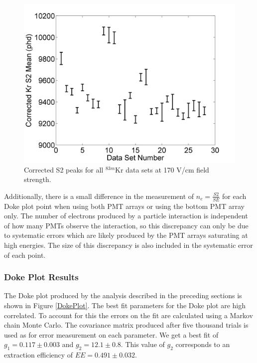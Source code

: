 \documentclass[a4paper,12pt]{article}
\begin{document}
{\begin{figure}[H]
\centering
\includegraphics[scale=0.4]{S2Variation.png}
\caption{Corrected S2 peaks for all $^{83m}$Kr data sets at 170 V/cm field strength.}
\label{S2Variation}
\end{figure}

Additionally, there is a small difference in the measurement of $n_e=\frac{S2}{SE}$ for each Doke plot point when using both PMT arrays or using the bottom PMT array only. The number of electrons produced by a particle interaction is independent of how many PMTs observe the interaction, so this discrepancy can only be due to systematic errors which are likely produced by the PMT arrays saturating at high energies.  The size of this discrepancy is also included in the systematic error  of each point. 

\subsubsection{Doke Plot Results}


The Doke plot produced by the analysis described in the preceding sections is shown
in Figure \ref{DokePlot}.  The best fit parameters for the Doke plot are high correlated.  To account for this the errors on the fit are calculated using a Markov chain Monte Carlo.  The covariance matrix produced after five thousand trials is used as for error measurement on each parameter.  We get a best fit of $g_1= 0.117 \pm 0.003$ and $g_2=12.1 \pm 0.8$.  This value of $g_2$ corresponds to an extraction efficiency of $EE = 0.491 \pm 0.032$.

}
\end{document}
